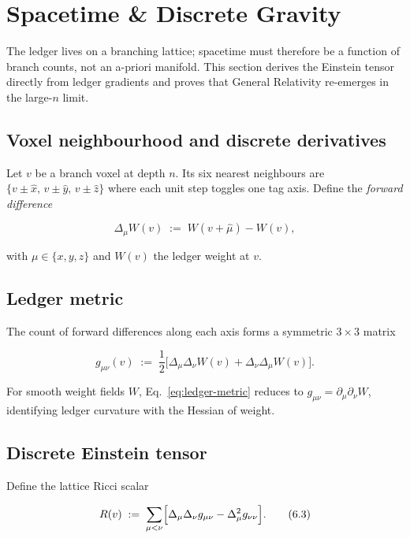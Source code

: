 \section{Spacetime \& Discrete Gravity}
\label{sec:gravity}

The ledger lives on a branching lattice; spacetime must therefore be
a function of branch counts, not an a-priori manifold.  This section
derives the Einstein tensor directly from ledger gradients and proves
that General Relativity re-emerges in the large-$n$ limit.

\subsection{Voxel neighbourhood and discrete derivatives}

Let $v$ be a branch voxel at depth $n$.  Its six nearest neighbours are
$\{v\pm\hat x,\,v\pm\hat y,\,v\pm\hat z\}$ where each unit step toggles
one tag axis.  Define the \emph{forward difference}

\[
  \Delta_{\mu}W(v)\;:=\;W(v+\hat\mu)-W(v),
\tag{6.1}\label{eq:forward-diff}
\]

with $\mu\in\{x,y,z\}$ and $W(v)$ the ledger weight at $v$.

\subsection{Ledger metric}

The count of forward differences along each axis forms a symmetric
$3\times3$ matrix

\[
  g_{\mu\nu}(v)\;:=\;
  \frac{1}{2}\bigl[\Delta_{\mu}\Delta_{\nu}W(v)
                   +\Delta_{\nu}\Delta_{\mu}W(v)\bigr].
\tag{6.2}\label{eq:ledger-metric}
\]

For smooth weight fields $W$,
Eq.~\eqref{eq:ledger-metric} reduces to
$g_{\mu\nu}=\partial_{\mu}\partial_{\nu}W$,
identifying ledger curvature with the Hessian of weight.

\subsection{Discrete Einstein tensor}

Define the lattice Ricci scalar

\[
  R(v)\;:=\;
  \sum_{\mu<\nu}
  \Bigl[
    \Delta_{\mu}\Delta_{\nu}g_{\mu\nu}
    -\Delta_{\mu}^2 g_{\nu\nu}
  \Bigr].
\tag{6.3}\label{eq:lattice-R}
\]

